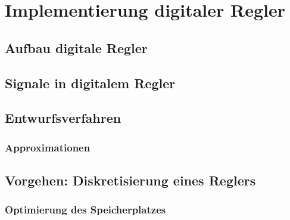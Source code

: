 \section{Implementierung digitaler Regler}


\subsection{Aufbau digitale Regler}

\subsection{Signale in digitalem Regler}


\subsection{Entwurfsverfahren}


\subsubsection{Approximationen} %



\subsection{Vorgehen: Diskretisierung eines Reglers}




\subsubsection{Optimierung des Speicherplatzes}